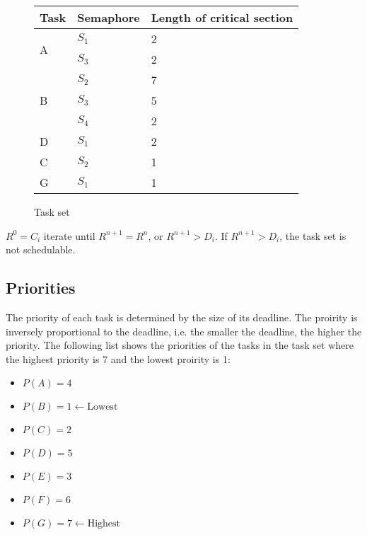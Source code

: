    \renewcommand{\arraystretch}{1.4}
    \begin{figure}[H]
    \centering
    \begin{minipage}{0.5\textwidth}
        \begin{table}[H]
        \centering
            \begin{tabular}{|l|l|l|}
            \hline
            \rowcolor{green!40}\textbf{Task} & \textbf{Semaphore} & \textbf{Length of critical section}   \\ \hline
            \multirow{2}{*}{A}  & $S_1$ & 2 \\
                                & $S_3$ & 2 \\ \hline
            \multirow{3}{*}{B}  & $S_2$ & 7 \\
                                & $S_3$ & 5 \\ 
                                & $S_4$ & 2 \\ \hline
            D                   & $S_1$ & 2 \\ \hline
            C                   & $S_2$ & 1 \\ \hline
            G                   & $S_1$ & 1 \\ \hline
            \end{tabular}
        \end{table}
    \end{minipage}
    \caption{Task set}
    \label{fig:semaphores}
    \end{figure}
\renewcommand{\arraystretch}{1.0}

$R^0 = C_i$
iterate until $R^{n+1} = R^n$, or $R^{n+1} > D_i$. If $R^{n+1} > D_i$, the task set is not schedulable.

\subsection{\textbf{Priorities}}
The priority of each task is determined by the size of its deadline. The proirity is inversely proportional to the deadline, i.e. the smaller the deadline, the higher the priority. The following list shows the priorities of the tasks in the task set where the highest priority is 7 and the lowest proirity is 1:
\begin{itemize}
    \item $P(A) = 4$
    \item $P(B) = 1 \leftarrow \text{Lowest}$
    \item $P(C) = 2$
    \item $P(D) = 5$
    \item $P(E) = 3$
    \item $P(F) = 6$
    \item $P(G) = 7 \leftarrow \text{Highest}$
\end{itemize}

